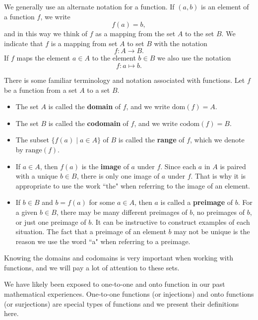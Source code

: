 We generally use an alternate notation for a function. If $(a,b)$ is an element of a function $f$, we write
\[f(a)=b,\]
and in this way we think of $f$ as a mapping from the set $A$ to the set $B$. We indicate that $f$ is a mapping from set $A$ to set $B$ with the notation
\[f : A \to B.\]
If $f$ maps the element $a \in A$ to the element $b \in B$ we also use the notation 
\[f : a \mapsto b.\]

There is some familiar terminology and notation associated with functions. Let $f$ be a function from a set $A$ to a set $B$. 
\begin{itemize}
\item The set $A$ is called the \textbf{domain} of $f$, and we write $\text{dom}(f) = A$.
\item The set $B$ is called the \textbf{codomain} of $f$, and we write $\text{codom}(f) = B$. 
\item The subset $\{f(a) \mid a \in A\}$ of $B$ is called the \textbf{range} of $f$, which we denote by $\text{range}(f)$. 
\item If $a \in A$, then $f(a)$ is the \textbf{image} of $a$ under $f$. Since each $a$ in $A$ is paired with a unique $b \in B$, there is only one image of $a$ under $f$. That is why it is appropriate to use the work ``the" when referring to the image of an element. 
\item If $b \in B$ and $b = f(a)$ for some $a \in A$, then $a$ is called a \textbf{preimage} of $b$. For a given $b \in B$, there may be many different preimages of $b$, no preimages of $b$, or just one preimage of $b$. It can be instructive to construct examples of each situation. The fact that a preimage of an element $b$ may not be unique is the reason we use the word ``a" when referring to a preimage. 
\end{itemize}

Knowing the domains and codomains is very important when working with functions, and we will pay a lot of attention to these sets. 

We have likely been exposed to one-to-one and onto function in our past mathematical experiences. One-to-one functions (or injections) and onto functions (or surjections) are special types of functions and we present their definitions here.

